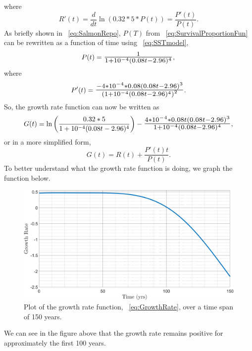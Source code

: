 where
\begin{equation}
    R'(t) = \frac{d}{dt}\ln(0.32*5*P(t)) = \frac{P'(t)}{P(t)}.
\end{equation}
As briefly shown in \equationautorefname~\eqref{eq:SalmonRepo}, $P(T)$ from \equationautorefname~\eqref{eq:SurvivalProportionFun} can be rewritten as a function of time using \equationautorefname~\eqref{eq:SSTmodel},
\begin{equation}\label{eq:Repodiff}
    P(t) = \scalebox{1.3}{$\frac{1}{1+10^{-4}(0.08t-2.96)^4}$},\\
\end{equation}
where
\begin{equation}
    P'(t) = \scalebox{1.3}{$\frac{-4*10^{-4}*0.08(0.08t-2.96)^3}{\left(1+10^{-4}(0.08t-2.96)^4\right)^2}$}.\\
\end{equation}
So, the growth rate function can now be written as
\begin{equation}
    G(t) = \ln\left(\frac{0.32*5}{1+10^{-4}(0.08t-2.96)^4}\right) - \scalebox{1.3}{$\frac{4*10^{-4}*0.08t(0.08t-2.96)^3}{1+10^{-4}(0.08t-2.96)^4}$},
\end{equation}
or in a more simplified form,
\begin{equation}\label{eq:GrowthRate}
    G(t) = R(t) + \frac{P'(t)t}{P(t)}.
\end{equation}
To better understand what the growth rate function is doing, we graph the function below.
\begin{figure}[H]
    \centering
    \includegraphics[width=14cm]{Pictures/Salmon Pop/GrowthRateFun.png}
    \caption{\singlespacing
    Plot of the growth rate function, \equationautorefname~\eqref{eq:GrowthRate}, over a time span of 150 years.}
    \label{fig:GrowthRateFunction}
\end{figure}
We can see in the figure above that the growth rate remains positive for approximately the first 100 years. 
